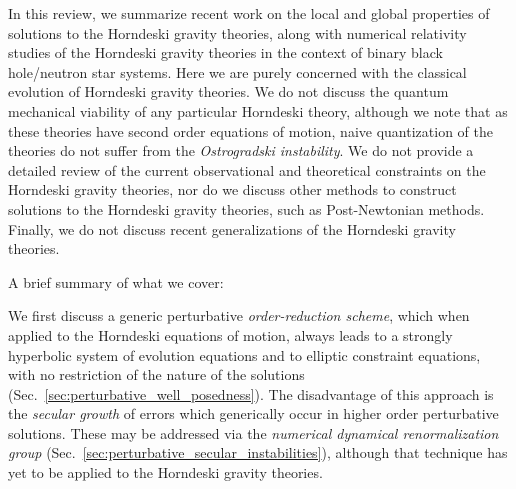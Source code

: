 \documentclass{ws-ijmpd}
\begin{document}
In this review, we summarize recent work on the local and global
properties of solutions to
the Horndeski gravity theories, along with numerical
relativity studies of the Horndeski gravity theories in the
context of binary black hole/neutron star systems.
Here we are purely concerned with the classical evolution
of Horndeski gravity theories.
We do not discuss
the quantum mechanical viability of any particular Horndeski theory,
although we note that as these theories have second order equations
of motion, naive quantization of the theories
do not suffer from the 
\emph{Ostrogradski instability}\cite{Woodard:2015zca,Kobayashi:2019hrl}.
We do not provide a detailed review of
the current observational and
theoretical constraints on the Horndeski gravity theories, nor
do we discuss other methods to construct solutions to the
Horndeski gravity theories, such as Post-Newtonian methods.
Finally, we do not discuss recent generalizations of the Horndeski
gravity theories\cite{Kobayashi:2019hrl}.

A brief summary of what we cover:

We first discuss a generic perturbative
\emph{order-reduction scheme}, which when applied to the Horndeski
equations of motion, always leads to a strongly hyperbolic system of
evolution equations and to elliptic constraint equations, with
no restriction of the nature of the solutions 
(Sec.~\ref{sec:perturbative_well_posedness}).
The disadvantage of this approach is the \emph{secular growth}
of errors which generically occur in higher order perturbative solutions.
These may be addressed via the 
\emph{numerical dynamical renormalization group}
(Sec.~\ref{sec:perturbative_secular_instabilities}), although
that technique has yet to be applied to the Horndeski gravity theories.
\end{document}
